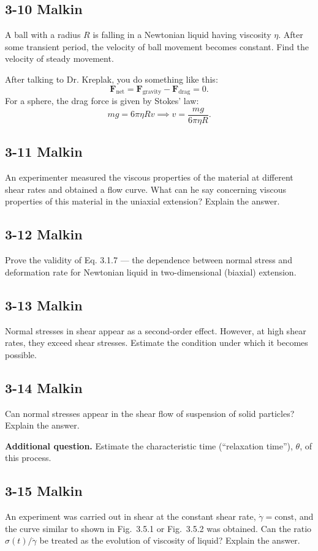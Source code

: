 \subsection{3-10 Malkin}
A ball with a radius $R$ is falling in a Newtonian liquid having viscosity $\eta$. After some transient period, the velocity of ball movement becomes constant. Find the velocity of steady movement.

After talking to Dr. Kreplak, you do something like this:
\[
	\mathbf{F}_\text{net} = \mathbf{F}_\text{gravity} - \mathbf{F}_\text{drag} = 0.
\]
For a sphere, the drag force is given by Stokes' law:
\[
	mg = 6\pi \eta R v \implies v = \frac{mg}{6\pi \eta R}.
\]



\subsection{3-11 Malkin}
An experimenter measured the viscous properties of the material at different shear rates and obtained a flow curve. What can he say concerning viscous properties of this material in the uniaxial extension? Explain the answer.

\subsection{3-12 Malkin}
Prove the validity of Eq. 3.1.7 — the dependence between normal stress and deformation rate for Newtonian liquid in two-dimensional (biaxial) extension.

\subsection{3-13 Malkin}
Normal stresses in shear appear as a second-order effect. However, at high shear rates, they exceed shear stresses. Estimate the condition under which it becomes possible.

\subsection{3-14 Malkin}
Can normal stresses appear in the shear flow of suspension of solid particles? Explain the answer.

\textbf{Additional question.} Estimate the characteristic time (``relaxation time''), $\theta$, of this process.

\subsection{3-15 Malkin}
An experiment was carried out in shear at the constant shear rate, $\dot{\gamma}=\mathrm{const}$, and the curve similar to shown in Fig.~3.5.1 or Fig.~3.5.2 was obtained. Can the ratio $\sigma(t)/\dot{\gamma}$ be treated as the evolution of viscosity of liquid? Explain the answer.

